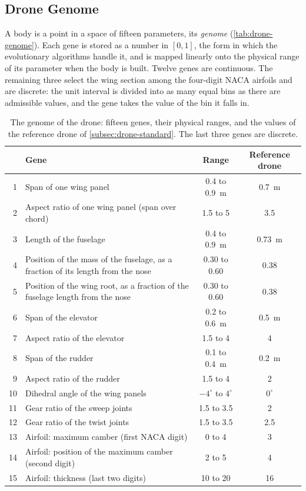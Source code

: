 \subsection{Drone Genome}
\label{subsec:drone-genome}

A body is a point in a space of fifteen parameters, its \emph{genome} (\autoref{tab:drone-genome}). Each gene is stored as a number in $[0,1]$, the form in which the evolutionary algorithms handle it, and is mapped linearly onto the physical range of its parameter when the body is built. Twelve genes are continuous. The remaining three select the wing section among the four-digit NACA airfoils and are discrete: the unit interval is divided into as many equal bins as there are admissible values, and the gene takes the value of the bin it falls in.

\begin{table}[htbp]
\centering
\begin{tabularx}{\textwidth}{r >{\raggedright\arraybackslash}X c c}
\hline
 & Gene & Range & Reference drone \\
\hline
1 & Span of one wing panel & 0.4 to 0.9~m & 0.7~m \\
2 & Aspect ratio of one wing panel (span over chord) & 1.5 to 5 & 3.5 \\
3 & Length of the fuselage & 0.4 to 0.9~m & 0.73~m \\
4 & Position of the mass of the fuselage, as a fraction of its length from the nose & 0.30 to 0.60 & 0.38 \\
5 & Position of the wing root, as a fraction of the fuselage length from the nose & 0.30 to 0.60 & 0.38 \\
6 & Span of the elevator & 0.2 to 0.6~m & 0.5~m \\
7 & Aspect ratio of the elevator & 1.5 to 4 & 4 \\
8 & Span of the rudder & 0.1 to 0.4~m & 0.2~m \\
9 & Aspect ratio of the rudder & 1.5 to 4 & 2 \\
10 & Dihedral angle of the wing panels & $-4^{\circ}$ to $4^{\circ}$ & $0^{\circ}$ \\
11 & Gear ratio of the sweep joints & 1.5 to 3.5 & 2 \\
12 & Gear ratio of the twist joints & 1.5 to 3.5 & 2.5 \\
13 & Airfoil: maximum camber (first NACA digit) & 0 to 4 & 3 \\
14 & Airfoil: position of the maximum camber (second digit) & 2 to 5 & 4 \\
15 & Airfoil: thickness (last two digits) & 10 to 20 & 16 \\
\hline
\end{tabularx}
\caption[Genome of the drone]{The genome of the drone: fifteen genes, their physical ranges, and the values of the reference drone of \autoref{subsec:drone-standard}. The last three genes are discrete.}
\label{tab:drone-genome}
\end{table}

